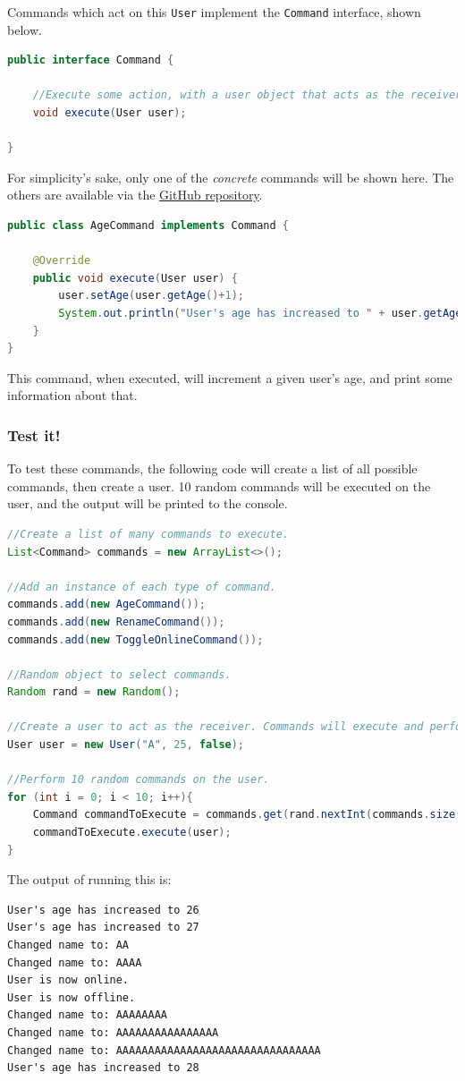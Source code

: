 \documentclass{article}
\begin{document}
	    		Commands which act on this \verb|User| implement the \verb|Command| interface, shown below.

	    		\begin{lstlisting}[language=java]
public interface Command {

    //Execute some action, with a user object that acts as the receiver.
    void execute(User user);

}
	    		\end{lstlisting}

	    		For simplicity's sake, only one of the \textit{concrete} commands will be shown here. The others are available via the \href{https://github.com/andrewlalis/CommandPatternTutorial}{GitHub repository}.

	    		\begin{lstlisting}[language=java]
public class AgeCommand implements Command {

    @Override
    public void execute(User user) {
        user.setAge(user.getAge()+1);
        System.out.println("User's age has increased to " + user.getAge());
    }
}
	    		\end{lstlisting}

	    		This command, when executed, will increment a given user's age, and print some information about that.

		    \subsubsection{Test it!}
	    		To test these commands, the following code will create a list of all possible commands, then create a user. 10 random commands will be executed on the user, and the output will be printed to the console.

	    		\begin{lstlisting}[language=java]
//Create a list of many commands to execute.
List<Command> commands = new ArrayList<>();

//Add an instance of each type of command.
commands.add(new AgeCommand());
commands.add(new RenameCommand());
commands.add(new ToggleOnlineCommand());

//Random object to select commands.
Random rand = new Random();

//Create a user to act as the receiver. Commands will execute and perform an action on the receiver.
User user = new User("A", 25, false);

//Perform 10 random commands on the user.
for (int i = 0; i < 10; i++){
    Command commandToExecute = commands.get(rand.nextInt(commands.size()));
    commandToExecute.execute(user);
}
	    		\end{lstlisting}

	    		The output of running this is:

	    		\begin{lstlisting}
User's age has increased to 26
User's age has increased to 27
Changed name to: AA
Changed name to: AAAA
User is now online.
User is now offline.
Changed name to: AAAAAAAA
Changed name to: AAAAAAAAAAAAAAAA
Changed name to: AAAAAAAAAAAAAAAAAAAAAAAAAAAAAAAA
User's age has increased to 28
	    		\end{lstlisting}
\end{document}
